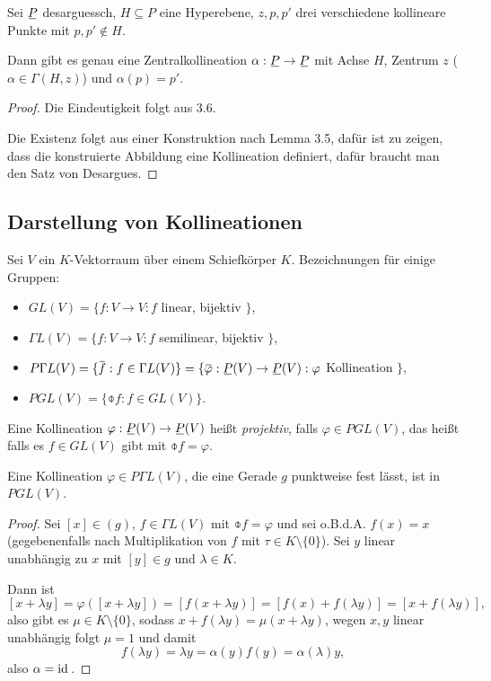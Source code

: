 \begin{thm}
 Sei $\proj$ desarguessch, $H \subseteq P$ eine Hyperebene, $z, p, p'$ drei verschiedene kollineare Punkte mit $p, p' \notin H$.
 
 Dann gibt es genau eine Zentralkollineation $\alpha: \proj \to \proj$ mit Achse $H$, Zentrum $z$ ($\alpha \in \Gamma(H,z)$) und $\alpha(p) = p'$.
\end{thm}

\begin{proof}
 Die Eindeutigkeit folgt aus 3.6.
 
 Die Existenz folgt aus einer Konstruktion nach Lemma 3.5, dafür ist zu zeigen, dass die konstruierte Abbildung eine Kollineation definiert, dafür braucht man den Satz von Desargues.
\end{proof}

\subsection{Darstellung von Kollineationen}
Sei $V$ ein $K$-Vektorraum über einem Schiefkörper $K$. Bezeichnungen für einige Gruppen:
\begin{itemize}
 \item $GL(V) = \{ f: V \to V : f$ linear, bijektiv $\}$,
 \item $\Gamma L(V) = \{ f: V \to V : f$ semilinear, bijektiv $\}$,
 \item $P \Gamma L(V) = \{ \obar{f} : f \in \Gamma L(V) \} = \{ \obar{\varphi} : \proj(V) \to \proj(V) : \varphi$ Kollineation $\}$,
 \item $PGL(V) = \{ \obar{f} : f \in GL(V) \}$.
\end{itemize}

\begin{defn*}
 Eine Kollineation $\varphi: \proj(V) \to \proj(V)$ heißt \emph{projektiv}, falls $\varphi \in PGL(V)$, das heißt falls es $f \in GL(V)$ gibt mit $\obar{f} = \varphi$.
\end{defn*}

\begin{folg}
 Eine Kollineation $\varphi \in P\Gamma L(V)$, die eine Gerade $g$ punktweise fest lässt, ist in $PGL(V)$.
\end{folg}

\begin{proof}
 Sei $[x] \in (g)$, $f \in \Gamma L(V)$ mit $\obar{f} = \varphi$ und sei o.B.d.A. $f(x) = x$ (gegebenenfalls nach Multiplikation von $f$ mit $\tau \in K \setminus \{ 0 \}$). Sei $y$ linear unabhängig zu $x$ mit $[y] \in g$ und $\lambda \in K$.
 
 Dann ist 
 \[ [x + \lambda y] = \varphi ([x+\lambda y]) = [f(x+\lambda y)] = [ f(x) + f(\lambda y) ] = [x + f(\lambda y) ], \]
 also gibt es $\mu \in K \setminus \{0\}$, sodass $x + f(\lambda y) = \mu( x + \lambda y)$, wegen $x,y$ linear unabhängig folgt $\mu = 1$ und damit
 \[ f(\lambda y) = \lambda y = \alpha(y) f(y) = \alpha(\lambda) y, \]
 also $\alpha = \mathrm{id}\,$.
\end{proof}

